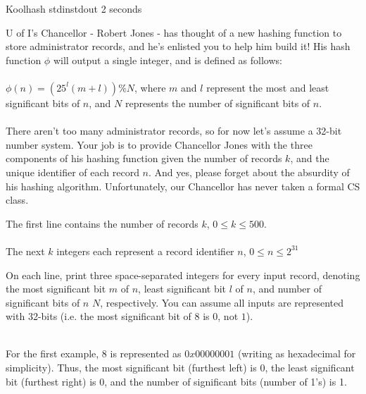 \begin{problem}{Koolhash}
{stdin}{stdout}
{2 seconds}{}{}

U of I's Chancellor - Robert Jones - has thought of a new hashing function to store administrator records, and he's enlisted you to help him build it! His hash function $\phi$ will output a single integer, and is defined as follows: \\ \\
$\phi(n) = (25^l(m+l)) \% N$, where $m$ and $l$ represent the most and least significant bits of $n$, and $N$ represents the number of significant bits of $n$. \\ \\ 
There aren't too many administrator records, so for now let's assume a 32-bit number system. Your job is to provide Chancellor Jones with the three components of his hashing function given the number of records $k$, and the unique identifier of each record $n$. And yes, please forget about the absurdity of his hashing algorithm. Unfortunately, our Chancellor has never taken a formal CS class. 

\InputFile
The first line contains the number of records $k$, $0 \leq k \leq 500$. \\ \\
The next $k$ integers each represent a record identifier $n$, $0 \leq n \leq 2^{31}$

\OutputFile
On each line, print three space-separated integers for every input record, denoting the most significant bit $m$ of $n$, least significant bit $l$ of $n$, and number of significant bits of $n$ $N$, respectively. You can assume all inputs are represented with 32-bits (i.e. the most significant bit of $8$ is $0$, not $1$).

\Examples

\begin{example}
%
\end{example}

\begin{example}
%
\end{example} \\
\Explanation
For the first example, $8$ is represented as $0x00000001$ (writing as hexadecimal for simplicity). Thus, the most significant bit (furthest left) is 0, the least significant bit (furthest right) is 0, and the number of significant bits (number of 1's) is 1. 
\end{problem}